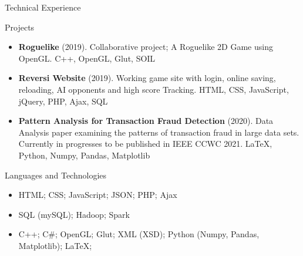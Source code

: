 \documentclass[]{mcdowellcvcustom}
\begin{document}
	\begin{cvsection}{Technical Experience}
		\begin{cvsubsection}{Projects}{}{}
			\begin{itemize}
				\item \textbf{Roguelike} (2019). Collaborative project; A Roguelike 2D Game using OpenGL.  C++, OpenGL, Glut, SOIL
				\item \textbf{Reversi Website} (2019). Working game site with login, online saving, reloading, AI opponents and high score Tracking.  HTML, CSS, JavaScript, jQuery, PHP, Ajax, SQL
				\item \textbf{Pattern Analysis for Transaction Fraud Detection} (2020). Data Analysis paper examining the patterns of transaction fraud in large data sets. Currently in progresses to be published in IEEE CCWC 2021. \LaTeX, Python, Numpy, Pandas, Matplotlib
			\end{itemize}
		\end{cvsubsection}
	\end{cvsection}
	
	\vspace{10mm}

	\begin{cvsection}{Languages and Technologies}
		\begin{cvsubsection}{}{}{}	
			\begin{itemize}
				\item HTML; CSS; JavaScript; JSON; PHP; Ajax
				\item SQL (mySQL); Hadoop; Spark
				\item C++; C\#; OpenGL; Glut; XML (XSD); Python (Numpy, Pandas, Matplotlib); \LaTeX ; 
			\end{itemize}
		\end{cvsubsection}
	\end{cvsection}
	
\end{document}
